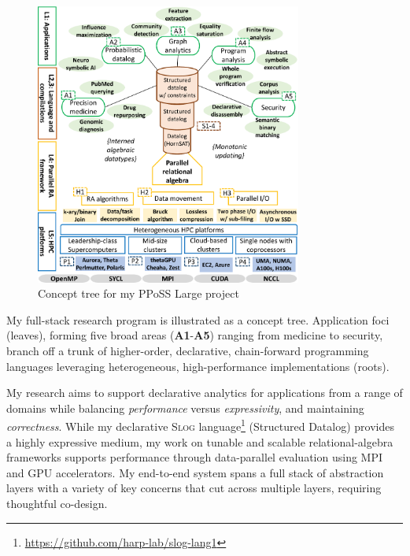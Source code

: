 \documentclass[12pt]{article}
\begin{document}
\begin{figure}
\vspace{-0.85cm}
\centering
\includegraphics[width=3.45in]{PPoSS_Tree.pdf}
\vspace{-.9cm}
\caption{\footnotesize Concept tree for my PPoSS Large project}
\vspace{-0.55cm}
\end{figure}
%
My full-stack research program is illustrated as a concept tree. 
Application foci (leaves), forming five broad areas (\textbf{A1}-\textbf{A5}) ranging from medicine to security, branch off a trunk of higher-order, declarative, chain-forward programming languages leveraging heterogeneous, high-performance implementations (roots).

My research aims to support declarative analytics for applications from a range of domains while balancing \emph{performance} versus \emph{expressivity}, and maintaining \emph{correctness}. While my declarative \textsc{Slog} language\footnote{\url{https://github.com/harp-lab/slog-lang1}} (Structured Datalog) provides a highly expressive medium, my work on tunable and scalable relational-algebra frameworks supports performance through data-parallel evaluation using MPI and GPU accelerators. My end-to-end system spans a full stack of abstraction layers with a variety of key concerns that cut across multiple layers, requiring thoughtful co-design.
\end{document}

